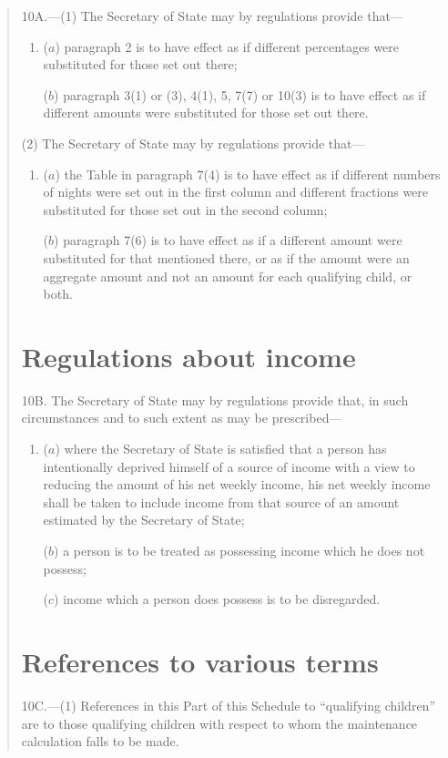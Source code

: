 \documentclass[12pt,a4paper]{article}
\begin{document}
\begin{quotation}
10A.---(1) The Secretary of State may by regulations provide that—
\begin{enumerate}\item[]
($a$) paragraph 2 is to have effect as if different percentages were substituted for those set out there;

($b$) paragraph 3(1)  or (3), 4(1), 5, 7(7)  or 10(3)  is to have effect as if different amounts were substituted for those set out there.
\end{enumerate}

(2) The Secretary of State may by regulations provide that—
\begin{enumerate}\item[]
($a$) the Table in paragraph 7(4)  is to have effect as if different numbers of nights were set out in the first column and different fractions were substituted for those set out in the second column;

($b$) paragraph 7(6)  is to have effect as if a different amount were substituted for that mentioned there, or as if the amount were an aggregate amount and not an amount for each qualifying child, or both.
\end{enumerate}

\section*{Regulations about income}

10B. The Secretary of State may by regulations provide that, in such circumstances and to such extent as may be prescribed—
\begin{enumerate}\item[]
($a$) where the Secretary of State is satisfied that a person has intentionally deprived himself of a source of income with a view to reducing the amount of his net weekly income, his net weekly income shall be taken to include income from that source of an amount estimated by the Secretary of State;

($b$) a person is to be treated as possessing income which he does not possess;

($c$) income which a person does possess is to be disregarded.
\end{enumerate}

\section*{References to various terms}

10C.---(1) References in this Part of this Schedule to “qualifying children” are to those qualifying children with respect to whom the maintenance calculation falls to be made.


\end{quotation}
\end{document}
